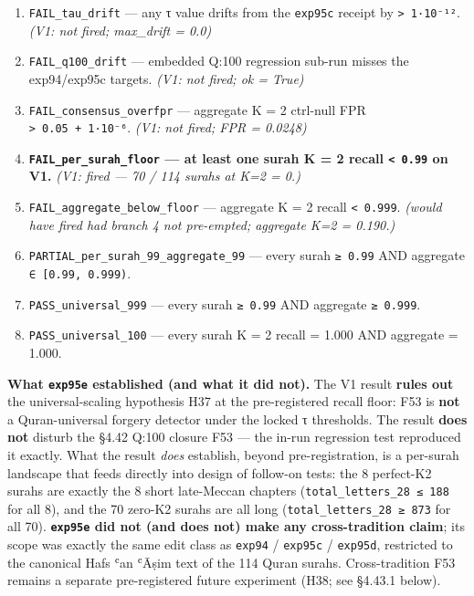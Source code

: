 \documentclass[
]{article}
\providecommand{\tightlist}{%
  \setlength{\itemsep}{0pt}\setlength{\parskip}{0pt}}
\begin{document}
\begin{enumerate}
\def\labelenumi{\arabic{enumi}.}
\tightlist
\item
  \texttt{FAIL\_tau\_drift} --- any τ value drifts from the
  \texttt{exp95c} receipt by \texttt{\textgreater{}\ 1·10⁻¹²}.
  \emph{(V1: not fired; max\_drift = 0.0)}
\item
  \texttt{FAIL\_q100\_drift} --- embedded Q:100 regression sub-run
  misses the exp94/exp95c targets. \emph{(V1: not fired; ok = True)}
\item
  \texttt{FAIL\_consensus\_overfpr} --- aggregate K = 2 ctrl-null FPR
  \texttt{\textgreater{}\ 0.05\ +\ 1·10⁻⁶}. \emph{(V1: not fired; FPR =
  0.0248)}
\item
  \textbf{\texttt{FAIL\_per\_surah\_floor} --- at least one surah K = 2
  recall \texttt{\textless{}\ 0.99} on V1.} \emph{(V1: fired --- 70 /
  114 surahs at K=2 = 0.)}
\item
  \texttt{FAIL\_aggregate\_below\_floor} --- aggregate K = 2 recall
  \texttt{\textless{}\ 0.999}. \emph{(would have fired had branch 4 not
  pre-empted; aggregate K=2 = 0.190.)}
\item
  \texttt{PARTIAL\_per\_surah\_99\_aggregate\_99} --- every surah
  \texttt{≥\ 0.99} AND aggregate \texttt{∈\ {[}0.99,\ 0.999)}.
\item
  \texttt{PASS\_universal\_999} --- every surah \texttt{≥\ 0.99} AND
  aggregate \texttt{≥\ 0.999}.
\item
  \texttt{PASS\_universal\_100} --- every surah K = 2 recall = 1.000 AND
  aggregate = 1.000.
\end{enumerate}

\textbf{What \texttt{exp95e} established (and what it did not).} The V1
result \textbf{rules out} the universal-scaling hypothesis H37 at the
pre-registered recall floor: F53 is \textbf{not} a Quran-universal
forgery detector under the locked τ thresholds. The result \textbf{does
not} disturb the §4.42 Q:100 closure F53 --- the in-run regression test
reproduced it exactly. What the result \emph{does} establish, beyond
pre-registration, is a per-surah landscape that feeds directly into
design of follow-on tests: the 8 perfect-K2 surahs are exactly the 8
short late-Meccan chapters (\texttt{total\_letters\_28\ ≤\ 188} for all
8), and the 70 zero-K2 surahs are all long
(\texttt{total\_letters\_28\ ≥\ 873} for all 70).
\textbf{\texttt{exp95e} did not (and does not) make any cross-tradition
claim}; its scope was exactly the same edit class as \texttt{exp94} /
\texttt{exp95c} / \texttt{exp95d}, restricted to the canonical Hafs ʿan
ʿĀṣim text of the 114 Quran surahs. Cross-tradition F53 remains a
separate pre-registered future experiment (H38; see §4.43.1 below).
\end{document}

